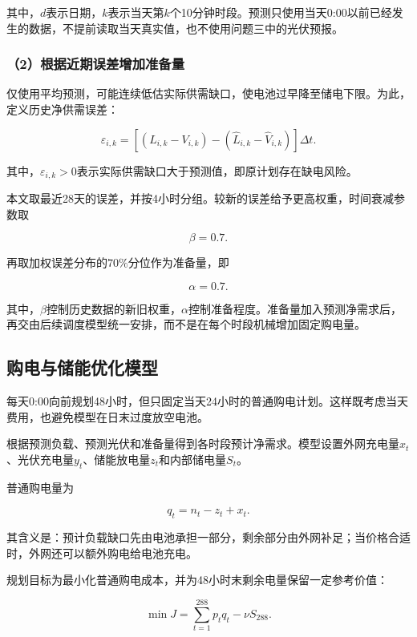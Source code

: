 其中，$d$表示日期，$k$表示当天第$k$个10分钟时段。预测只使用当天0:00以前已经发生的数据，不提前读取当天真实值，也不使用问题三中的光伏预报。


\subsubsection*{（2）根据近期误差增加准备量}

仅使用平均预测，可能连续低估实际供需缺口，使电池过早降至储电下限。为此，定义历史净供需误差：

\begin{equation}
\varepsilon_{i,k}
=
\left[
(L_{i,k}-V_{i,k})
-
(\widehat L_{i,k}-\widehat V_{i,k})
\right]\Delta t .
\end{equation}

其中，$\varepsilon_{i,k}>0$表示实际供需缺口大于预测值，即原计划存在缺电风险。

本文取最近28天的误差，并按4小时分组。较新的误差给予更高权重，时间衰减参数取

\[
\beta=0.7.
\]

再取加权误差分布的$70\%$分位作为准备量，即

\[
\alpha=0.7.
\]

其中，$\beta$控制历史数据的新旧权重，$\alpha$控制准备程度。准备量加入预测净需求后，再交由后续调度模型统一安排，而不是在每个时段机械增加固定购电量。


\subsection{购电与储能优化模型}

每天0:00向前规划48小时，但只固定当天24小时的普通购电计划。这样既考虑当天费用，也避免模型在日末过度放空电池。

根据预测负载、预测光伏和准备量得到各时段预计净需求。模型设置外网充电量$x_t$、光伏充电量$y_t$、储能放电量$z_t$和内部储电量$S_t$。

普通购电量为

\begin{equation}
q_t=n_t-z_t+x_t.
\end{equation}

其含义是：预计负载缺口先由电池承担一部分，剩余部分由外网补足；当价格合适时，外网还可以额外购电给电池充电。

规划目标为最小化普通购电成本，并为48小时末剩余电量保留一定参考价值：

\begin{equation}
\min J
=
\sum_{t=1}^{288}p_tq_t-\nu S_{288}.
\end{equation}

